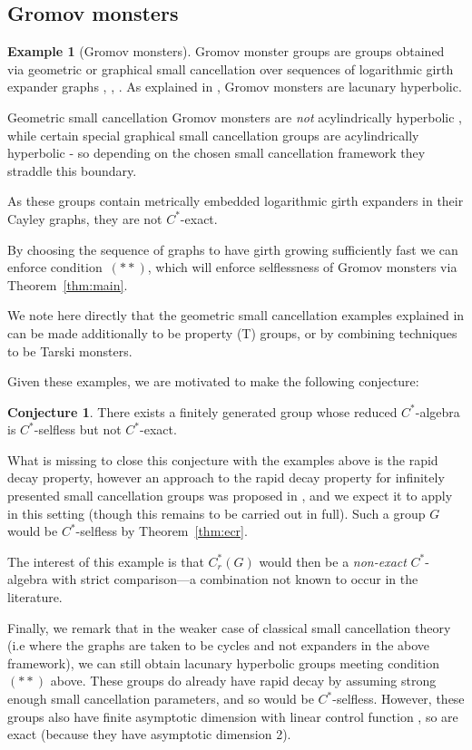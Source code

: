 \documentclass[12pt]{amsart}
\theoremstyle{plain}
\theoremstyle{definition}
\newtheorem{example}[theorem]{Example}
\newtheorem{conjecture}[theorem]{Conjecture}
\newcommand{\Cstar}{C^*}
\begin{document}
\subsection{Gromov monsters}

\begin{example}[Gromov monsters]\label{ex:gromov}
Gromov monster groups are groups obtained via geometric or graphical small cancellation
over sequences of logarithmic girth expander graphs \cite{GrRWRG}, \cite{ArzhDelzant}, \cite{Osajda}.
As explained in \cite{ArzhDelzant}, Gromov monsters are lacunary hyperbolic.

Geometric small cancellation Gromov monsters are \emph{not} acylindrically hyperbolic \cite{GST},
while certain special graphical small cancellation groups are
acylindrically hyperbolic \cite{GruberSisto} - so depending on the chosen small cancellation framework they straddle this boundary.

As these groups contain metrically embedded logarithmic girth expanders in their Cayley graphs, they are not $\Cstar$-exact. 

By choosing the sequence of graphs to have girth growing sufficiently fast we can enforce condition~$(**)$, which will enforce selflessness of Gromov monsters via Theorem~\ref{thm:main}. 

We note here directly that the geometric small cancellation examples explained in \cite{ArzhDelzant} can be made additionally to be property (T) groups, or by combining techniques to be Tarski monsters. 

Given these examples, we are motivated to make the following conjecture:
\begin{conjecture}
There exists a finitely generated group whose reduced $\Cstar$-algebra is $\Cstar$-selfless but not $\Cstar$-exact.
\end{conjecture}

What is missing to close this conjecture with the examples above is the rapid decay property, however an approach to the rapid decay property for infinitely presented small
cancellation groups was proposed in \cite{ArzhDrutu}, and we expect it to
apply in this setting (though this remains to be carried out in full). Such a group $G$ would be $\Cstar$-selfless by Theorem~\ref{thm:ecr}.

The interest of this example is that $C^*_r(G)$ would then be a
\emph{non-exact} $C^*$-algebra with strict comparison---a combination
not known to occur in the literature.

Finally, we remark that in the weaker case of classical small cancellation theory (i.e where the graphs are taken to be cycles and not expanders in the above framework), we can still obtain lacunary hyperbolic groups meeting condition~$(**)$ above. These groups do already have  rapid decay by \cite{ArzhDrutu} assuming strong enough small cancellation parameters, and so would be $\Cstar$-selfless. However, these groups also have finite asymptotic dimension with linear control function \cite{Sledd}, so are exact (because they have asymptotic dimension 2).
\end{example}
\end{document}

